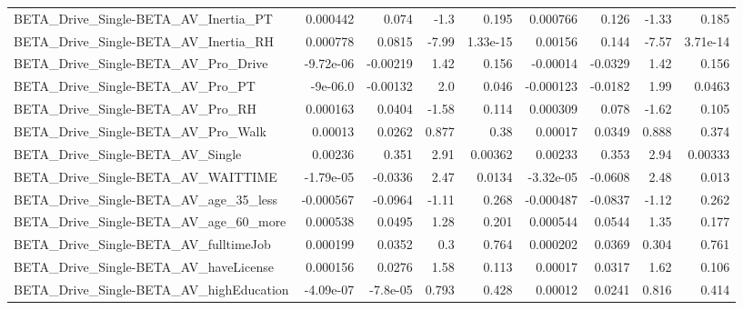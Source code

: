 \begin{tabular}{lrrrrrrrr}
BETA\_Drive\_Single-BETA\_AV\_Inertia\_PT               &    0.000442 &        0.074 &     -1.3 &    0.195 &   0.000766 &       0.126 &        -1.33 &         0.185 \\
BETA\_Drive\_Single-BETA\_AV\_Inertia\_RH               &    0.000778 &       0.0815 &    -7.99 & 1.33e-15 &    0.00156 &       0.144 &        -7.57 &      3.71e-14 \\
BETA\_Drive\_Single-BETA\_AV\_Pro\_Drive                &   -9.72e-06 &     -0.00219 &     1.42 &    0.156 &   -0.00014 &     -0.0329 &         1.42 &         0.156 \\
BETA\_Drive\_Single-BETA\_AV\_Pro\_PT                   &    -9e-06.0 &     -0.00132 &      2.0 &    0.046 &  -0.000123 &     -0.0182 &         1.99 &        0.0463 \\
BETA\_Drive\_Single-BETA\_AV\_Pro\_RH                   &    0.000163 &       0.0404 &    -1.58 &    0.114 &   0.000309 &       0.078 &        -1.62 &         0.105 \\
BETA\_Drive\_Single-BETA\_AV\_Pro\_Walk                 &     0.00013 &       0.0262 &    0.877 &     0.38 &    0.00017 &      0.0349 &        0.888 &         0.374 \\
BETA\_Drive\_Single-BETA\_AV\_Single                   &     0.00236 &        0.351 &     2.91 &  0.00362 &    0.00233 &       0.353 &         2.94 &       0.00333 \\
BETA\_Drive\_Single-BETA\_AV\_WAITTIME                 &   -1.79e-05 &      -0.0336 &     2.47 &   0.0134 &  -3.32e-05 &     -0.0608 &         2.48 &         0.013 \\
BETA\_Drive\_Single-BETA\_AV\_age\_35\_less              &   -0.000567 &      -0.0964 &    -1.11 &    0.268 &  -0.000487 &     -0.0837 &        -1.12 &         0.262 \\
BETA\_Drive\_Single-BETA\_AV\_age\_60\_more              &    0.000538 &       0.0495 &     1.28 &    0.201 &   0.000544 &      0.0544 &         1.35 &         0.177 \\
BETA\_Drive\_Single-BETA\_AV\_fulltimeJob              &    0.000199 &       0.0352 &      0.3 &    0.764 &   0.000202 &      0.0369 &        0.304 &         0.761 \\
BETA\_Drive\_Single-BETA\_AV\_haveLicense              &    0.000156 &       0.0276 &     1.58 &    0.113 &    0.00017 &      0.0317 &         1.62 &         0.106 \\
BETA\_Drive\_Single-BETA\_AV\_highEducation            &   -4.09e-07 &     -7.8e-05 &    0.793 &    0.428 &    0.00012 &      0.0241 &        0.816 &         0.414 \\

\end{tabular}
